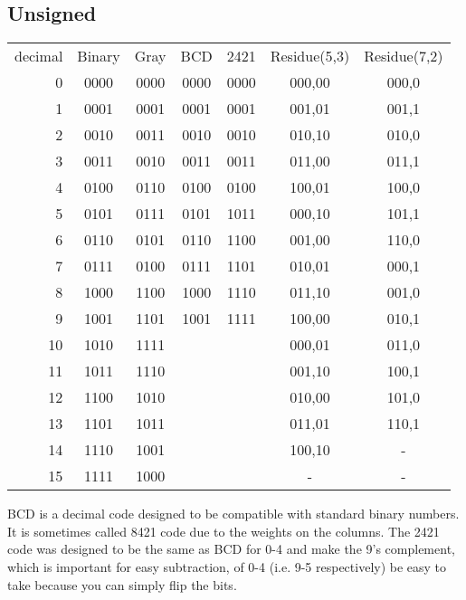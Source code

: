 \subsection{Unsigned}
\begin{tabular}{rcccccc}
decimal & Binary & Gray & BCD  & 2421 & Residue(5,3) & Residue(7,2) \\
0       & 0000   & 0000 & 0000 & 0000 & 000,00       & 000,0        \\
1       & 0001   & 0001 & 0001 & 0001 & 001,01       & 001,1        \\
2       & 0010   & 0011 & 0010 & 0010 & 010,10       & 010,0        \\
3       & 0011   & 0010 & 0011 & 0011 & 011,00       & 011,1        \\
4       & 0100   & 0110 & 0100 & 0100 & 100,01       & 100,0        \\
5       & 0101   & 0111 & 0101 & 1011 & 000,10       & 101,1        \\
6       & 0110   & 0101 & 0110 & 1100 & 001,00       & 110,0        \\
7       & 0111   & 0100 & 0111 & 1101 & 010,01       & 000,1        \\
8       & 1000   & 1100 & 1000 & 1110 & 011,10       & 001,0        \\
9       & 1001   & 1101 & 1001 & 1111 & 100,00       & 010,1        \\
10      & 1010   & 1111 &      &      & 000,01       & 011,0        \\
11      & 1011   & 1110 &      &      & 001,10       & 100,1        \\
12      & 1100   & 1010 &      &      & 010,00       & 101,0        \\
13      & 1101   & 1011 &      &      & 011,01       & 110,1        \\
14      & 1110   & 1001 &      &      & 100,10       & -            \\
15      & 1111   & 1000 &      &      & -            & -            \\
\end{tabular}

BCD is a decimal code designed to be compatible with standard binary numbers.  It is sometimes called 8421 code due to the weights on the columns.  The 2421 code was designed to be the same as BCD for 0-4 and make the 9's complement, which is important for easy subtraction, of 0-4 (i.e. 9-5 respectively) be easy to take because you can simply flip the bits.

